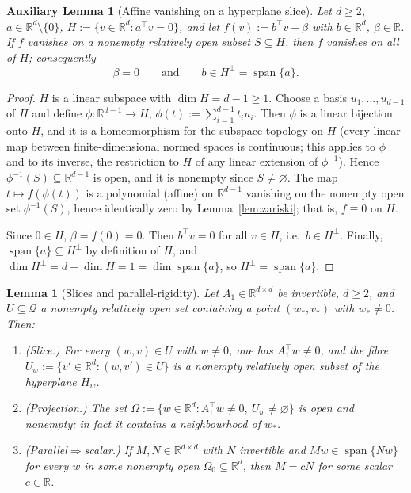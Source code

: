 \documentclass[11pt]{article}
\newtheorem{lemma}[theorem]{Lemma}
\theoremstyle{definition}
\theoremstyle{remark}
\theoremstyle{plain}
\newtheorem{auxlemma}{Auxiliary Lemma}
\newcommand{\R}{\mathbb{R}}
\newcommand{\cQ}{\mathcal{Q}}
\newcommand{\spn}{\operatorname{span}}
\begin{document}
\begin{auxlemma}[Affine vanishing on a hyperplane slice]\label{lem:auxaffine}
Let $d\ge2$, $a\in\R^d\setminus\{0\}$, $H:=\{v\in\R^d:a^\top v=0\}$, and let
$f(v):=b^\top v+\beta$ with $b\in\R^d$, $\beta\in\R$.  If $f$ vanishes on a nonempty
relatively open subset $S\subseteq H$, then $f$ vanishes on all of $H$; consequently
\[
\beta=0\qquad\text{and}\qquad b\in H^\perp=\spn\{a\}.
\]
\end{auxlemma}

\begin{proof}
$H$ is a linear subspace with $\dim H=d-1\ge1$.  Choose a basis $u_1,\dots,u_{d-1}$ of
$H$ and define $\phi:\R^{d-1}\to H$, $\phi(t):=\sum_{i=1}^{d-1}t_iu_i$.  Then $\phi$ is a
linear bijection onto $H$, and it is a homeomorphism for the subspace topology on $H$
(every linear map between finite-dimensional normed spaces is continuous; this applies to
$\phi$ and to its inverse, the restriction to $H$ of any linear extension of
$\phi^{-1}$).  Hence $\phi^{-1}(S)\subseteq\R^{d-1}$ is open, and it is nonempty since
$S\neq\varnothing$.  The map $t\mapsto f(\phi(t))$ is a polynomial (affine) on
$\R^{d-1}$ vanishing on the nonempty open set $\phi^{-1}(S)$, hence identically zero by
Lemma~\ref{lem:zariski}; that is, $f\equiv0$ on $H$.

Since $0\in H$, $\beta=f(0)=0$.  Then $b^\top v=0$ for all $v\in H$, i.e.\
$b\in H^\perp$.  Finally, $\spn\{a\}\subseteq H^\perp$ by definition of $H$, and
$\dim H^\perp=d-\dim H=1=\dim\spn\{a\}$, so $H^\perp=\spn\{a\}$.
\end{proof}

\begin{lemma}[Slices and parallel-rigidity]\label{lem:slices}
Let $A_1\in\R^{d\times d}$ be invertible, $d\ge2$, and $U\subseteq\cQ$ a nonempty
relatively open set containing a point $(w_*,v_*)$ with $w_*\neq0$.  Then:
\begin{enumerate}
\item[\textup{(a)}] \textup{(Slice.)}  For every $(w,v)\in U$ with $w\neq0$, one has
$A_1^\top w\neq0$, and the fibre $U_w:=\{v'\in\R^d:(w,v')\in U\}$ is a nonempty
relatively open subset of the hyperplane $H_w$.
\item[\textup{(b)}] \textup{(Projection.)}  The set
$\Omega:=\{w\in\R^d:A_1^\top w\neq0,\ U_w\neq\varnothing\}$ is open and nonempty; in fact
it contains a neighbourhood of $w_*$.
\item[\textup{(c)}] \textup{(Parallel}$\Rightarrow$\textup{scalar.)}  If
$M,N\in\R^{d\times d}$ with $N$ invertible and $Mw\in\spn\{Nw\}$ for every $w$ in some
nonempty open $\Omega_0\subseteq\R^d$, then $M=cN$ for some scalar $c\in\R$.
\end{enumerate}
\end{lemma}
\end{document}
